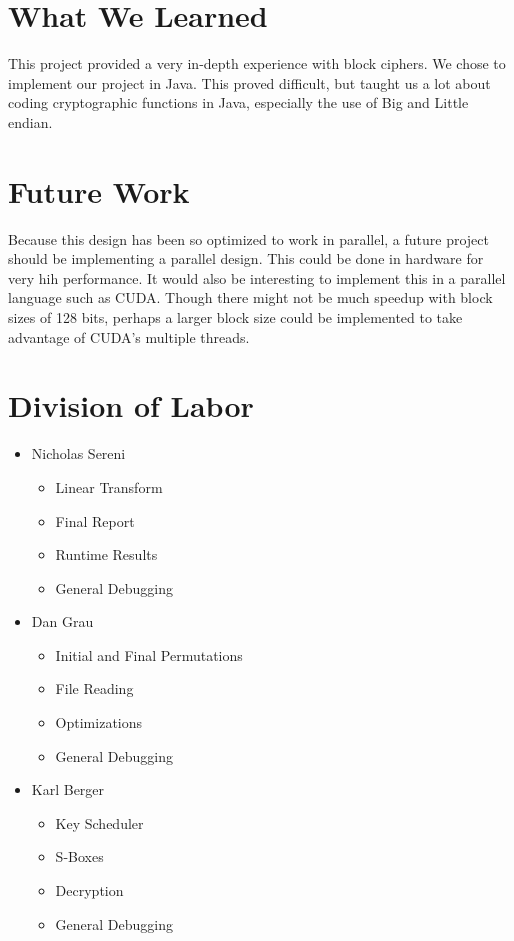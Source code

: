 \documentclass[12pt]{article} %
\begin{document}
\section{What We Learned}
This project provided a very in-depth experience with block ciphers. We chose to implement our project in Java. This proved difficult, but taught us a lot about coding cryptographic functions in Java, especially the use of Big and Little endian. 
\section{Future Work}
Because this design has been so optimized to work in parallel, a future project should be implementing a parallel design. This could be done in hardware for very hih performance. It would also be interesting to implement this in a parallel language such as CUDA. Though there might not be much speedup with block sizes of 128 bits, perhaps a larger block size could be implemented to take advantage of CUDA's multiple threads.

\section{Division of Labor}
\begin{itemize}
 \item Nicholas Sereni
 \begin{itemize}
  \item{Linear Transform}
  \item{Final Report}
  \item{Runtime Results}
  \item{General Debugging}
 \end{itemize}
 \item{Dan Grau}
 \begin{itemize}
  \item{Initial and Final Permutations}
  \item{File Reading}
  \item{Optimizations}
  \item{General Debugging}
 \end{itemize}
 \item{Karl Berger}
 \begin{itemize}
  \item{Key Scheduler}
  \item{S-Boxes}
  \item{Decryption}
  \item{General Debugging}
 \end{itemize}
\end{itemize}
\end{document}
